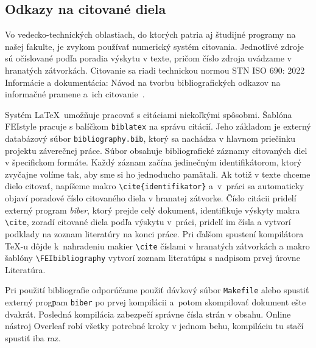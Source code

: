 \documentclass[../../../thesis.tex]{subfiles}
\begin{document}
\subsection{Odkazy na citované diela}
Vo vedecko-technických oblastiach, do ktorých patria aj študijné programy na našej fakulte, je zvykom používať numerický systém citovania. Jednotlivé zdroje sú očíslované podľa poradia výskytu v texte, pričom číslo zdroja uvádzame v hranatých zátvorkách.
Citovanie sa riadi technickou normou STN ISO 690: 2022 Informácie a dokumentácia: Návod na tvorbu bibliografických odkazov na informačné pramene a~ich citovanie~\cite{iso690}.

Systém \LaTeX\ umožňuje pracovať s citáciami niekoľkými spôsobmi.
Šablóna FEIstyle pracuje s balíčkom \verb|biblatex| na správu citácií. Jeho základom je externý databázový súbor \texttt{bibliography.bib},
ktorý sa nachádza v hlavnom priečinku projektu záverečnej práce.
Súbor obsahuje bibliografické záznamy citovaných diel
v špecifickom formáte.
Každý záznam začína jedinečným identifikátorom, ktorý zvyčajne
volíme tak, aby sme si ho jednoducho pamätali.
Ak totiž v texte chceme dielo citovať, napíšeme makro \verb|\cite{identifikator}| a~v~práci sa automaticky objaví poradové číslo citovaného diela v hranatej zátvorke.
Číslo citácii pridelí externý program \textsl{biber},
ktorý prejde celý dokument, identifikuje výskyty makra \verb|\cite|, zoradí citované diela podľa výskytu v~práci,
pridelí im čísla a vytvorí podklady na zoznam literatúry na konci práce.
Pri ďalšom spustení kompilátora \TeX-u dôjde k~nahradeniu makier
\verb|\cite| číslami v hranatých zátvorkách a makro šablóny
\verb|\FEIbibliography| vytvorí zoznam literatúры s nadpisom
prvej úrovne Literatúra.

Pri použití bibliografie odporúčame použiť dávkový súbor
\texttt{Makefile} alebo spustiť externý progрam \texttt{biber}
po prvej kompilácii a~potom skompilovať dokument ešte dvakrát.
Posledná kompilácia zabezpečí správne čísla strán v obsahu.
Online nástroj Overleaf robí všetky potrebné kroky v jednom behu,
kompiláciu tu stačí spustiť iba raz.
\end{document}
